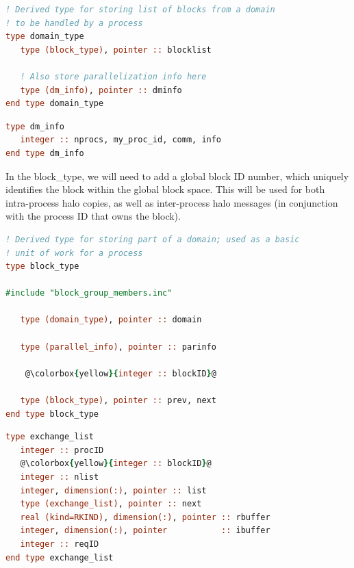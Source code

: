\documentclass[11pt]{report}
\begin{document}
\begin{lstlisting}[language=fortran,escapechar=@,frame=single]
! Derived type for storing list of blocks from a domain 
! to be handled by a process
type domain_type
   type (block_type), pointer :: blocklist

   ! Also store parallelization info here
   type (dm_info), pointer :: dminfo
end type domain_type
\end{lstlisting}

\begin{lstlisting}[language=fortran,escapechar=@,frame=single]
type dm_info
   integer :: nprocs, my_proc_id, comm, info
end type dm_info
\end{lstlisting}
\vspace{12pt}

In the block\_type, we will need to add a global block ID number, which uniquely identifies
the block within the global block space. This will be used for both intra-process halo copies, as well
as inter-process halo messages (in conjunction with the process ID that owns the block). 
\linebreak

\begin{lstlisting}[language=fortran,escapechar=@,frame=single]
! Derived type for storing part of a domain; used as a basic 
! unit of work for a process
type block_type

#include "block_group_members.inc"

   type (domain_type), pointer :: domain

   type (parallel_info), pointer :: parinfo
   
    @\colorbox{yellow}{integer :: blockID}@

   type (block_type), pointer :: prev, next
end type block_type
\end{lstlisting}

\begin{lstlisting}[language=fortran,escapechar=@,frame=single]
type exchange_list
   integer :: procID
   @\colorbox{yellow}{integer :: blockID}@
   integer :: nlist
   integer, dimension(:), pointer :: list
   type (exchange_list), pointer :: next
   real (kind=RKIND), dimension(:), pointer :: rbuffer
   integer, dimension(:), pointer           :: ibuffer
   integer :: reqID
end type exchange_list
\end{lstlisting}   
\vspace{12pt}
\end{document}
